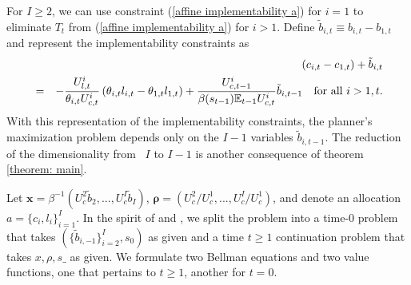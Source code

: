 \documentclass[thmsb,11pt]{article}
\begin{document}
\noindent For $I\geq 2$, we can use constraint (\ref{affine implementability
a}) for  $i=1$ to eliminate $T_{t}$ from (\ref{affine implementability a}) for $i > 1$. Define $\tilde{b}%
_{i,t}\equiv b_{i,t}-b_{1,t}$ and represent the implementability constraints
as
\begin{eqnarray}
&&\left( c_{i,t}-c_{1,t}\right) +\tilde{b}_{i,t}
\label{affine implementability b} \\
&=&-\frac{U_{l,t}^{i}}{\theta _{i,t}U_{c,t}^{i}}\left( \theta
_{i,t}l_{i,t}-\theta _{1,t}l_{1,t}\right) +\frac{U_{c,t-1}^{i}}{\beta(s_{t-1}) \mathbb{E}%
_{t-1}U_{c,t}^{i}}\tilde{b}_{i,t-1}\ \text{for\ all\ }i>1,t.  \notag
\end{eqnarray}%
\smallskip With this representation of the implementability constraints, the planner's
maximization problem depends only on the $I-1$ variables $\tilde{b}_{i,t-1}.$
The reduction of  the dimensionality from \ $I$ to $I-1$ is
 another consequence of theorem \ref{theorem: main}.

Let $\mathbf{x}= \beta^{-1}\left( U_{c}^{2}\tilde{b}_{2},...,U_{c}^{I}\tilde{b}_{I}\right)$, $\mathbf{\rho }=\left( U_{c}^{2}/U_{c}^{1},...,U_{c}^{I}/U_{c}^{1}\right) $, and denote an allocation $a=\{c_i,l_i\}^{I}_{i=1}.$
In the spirit of \cite{Kydland1980} and \cite{Farhi2010}, we split the problem into a time-0 problem that takes $(\{\tilde{b}_{i,-1}\}^{I}_{i=2}, s_0)$ as given and   a time $t \geq 1$ continuation problem  that takes $x,\rho,s\_$ as given. We formulate
two Bellman equations and two value functions, one that pertains to $t\geq 1$, another for $t=0$.
\end{document}
